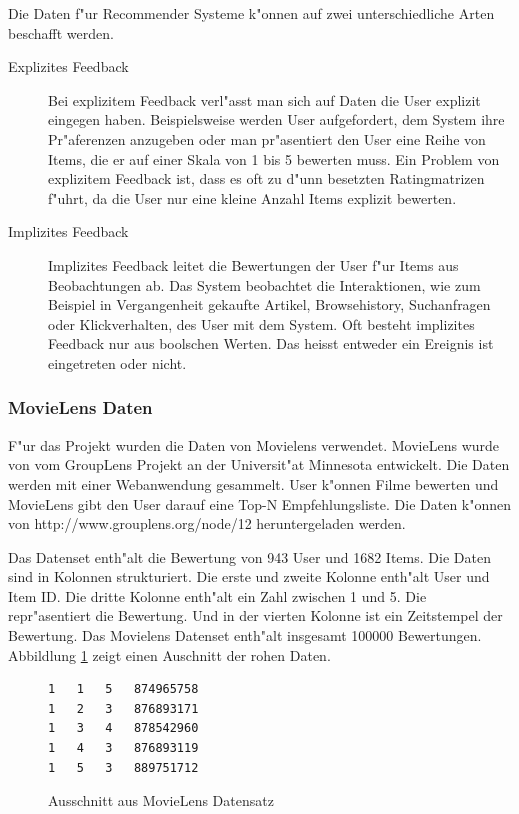 \documentclass[a4paper, 12pt]{article}
\begin{document}
Die Daten f"ur Recommender Systeme k"onnen auf zwei unterschiedliche Arten beschafft werden.

\begin{description}
\item[Explizites Feedback] Bei explizitem Feedback verl"asst man sich auf Daten die User explizit eingegen haben. Beispielsweise werden User aufgefordert, dem System ihre Pr"aferenzen anzugeben oder man pr"asentiert den User eine Reihe von Items, die er auf einer Skala von 1 bis 5 bewerten muss. Ein Problem von explizitem Feedback ist, dass es oft zu d"unn besetzten Ratingmatrizen f"uhrt, da die User nur eine kleine Anzahl Items explizit bewerten.
\item[Implizites Feedback] Implizites Feedback leitet die Bewertungen der User f"ur Items aus Beobachtungen ab. Das System beobachtet die Interaktionen, wie zum Beispiel in Vergangenheit gekaufte Artikel, Browsehistory, Suchanfragen oder Klickverhalten, des User mit dem System. Oft besteht implizites Feedback nur aus boolschen Werten. Das heisst entweder ein Ereignis ist eingetreten oder nicht.
\end{description}

\subsubsection{MovieLens Daten}
\label{sec:movielens}

F"ur das Projekt wurden die Daten von Movielens verwendet. MovieLens wurde von vom GroupLens Projekt an der Universit"at Minnesota entwickelt. Die Daten werden mit einer Webanwendung gesammelt. User k"onnen Filme bewerten und MovieLens gibt den User darauf eine Top-N Empfehlungsliste. Die Daten k"onnen von http://www.grouplens.org/node/12 heruntergeladen werden. 

Das Datenset enth"alt die Bewertung von 943 User und 1682 Items. Die Daten sind in Kolonnen strukturiert. Die erste und zweite Kolonne enth"alt User und Item ID. Die dritte Kolonne enth"alt ein Zahl zwischen 1 und 5. Die repr"asentiert die Bewertung. Und in der vierten Kolonne ist ein Zeitstempel der Bewertung. Das Movielens Datenset enth"alt insgesamt 100000 Bewertungen. Abbildlung \ref{fig:movielens} zeigt einen Auschnitt der rohen Daten.

\begin{figure}
\centering
\begin{verbatim}
1	1	5	874965758
1	2	3	876893171
1	3	4	878542960
1	4	3	876893119
1	5	3	889751712
\end{verbatim}
\caption{Ausschnitt aus MovieLens Datensatz}
\label{fig:movielens}
\end{figure}
\end{document}
